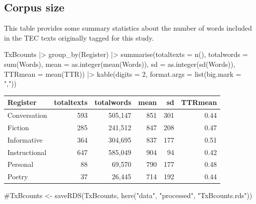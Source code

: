 \documentclass[
  letterpaper,
  DIV=11,
  numbers=noendperiod]{scrreprt}
\newenvironment{Shaded}{\begin{snugshade}}{\end{snugshade}}
\newcommand{\AttributeTok}[1]{\textcolor[rgb]{0.40,0.45,0.13}{#1}}
\newcommand{\CommentTok}[1]{\textcolor[rgb]{0.37,0.37,0.37}{#1}}
\newcommand{\DecValTok}[1]{\textcolor[rgb]{0.68,0.00,0.00}{#1}}
\newcommand{\FunctionTok}[1]{\textcolor[rgb]{0.28,0.35,0.67}{#1}}
\newcommand{\NormalTok}[1]{\textcolor[rgb]{0.00,0.23,0.31}{#1}}
\newcommand{\SpecialCharTok}[1]{\textcolor[rgb]{0.37,0.37,0.37}{#1}}
\newcommand{\StringTok}[1]{\textcolor[rgb]{0.13,0.47,0.30}{#1}}
\begin{document}
\subsection{Corpus size}\label{corpus-size}

This table provides some summary statistics about the number of words
included in the TEC texts originally tagged for this study.

\begin{Shaded}
\begin{Highlighting}[]
\NormalTok{TxBcounts  }\SpecialCharTok{|\textgreater{}}  
  \FunctionTok{group\_by}\NormalTok{(Register) }\SpecialCharTok{|\textgreater{}}  
  \FunctionTok{summarise}\NormalTok{(}\AttributeTok{totaltexts =} \FunctionTok{n}\NormalTok{(), }\AttributeTok{totalwords =} \FunctionTok{sum}\NormalTok{(Words), }\AttributeTok{mean =} \FunctionTok{as.integer}\NormalTok{(}\FunctionTok{mean}\NormalTok{(Words)), }\AttributeTok{sd =} \FunctionTok{as.integer}\NormalTok{(}\FunctionTok{sd}\NormalTok{(Words)), }\AttributeTok{TTRmean =} \FunctionTok{mean}\NormalTok{(TTR)) }\SpecialCharTok{|\textgreater{}}  
  \FunctionTok{kable}\NormalTok{(}\AttributeTok{digits =} \DecValTok{2}\NormalTok{, }\AttributeTok{format.args =} \FunctionTok{list}\NormalTok{(}\AttributeTok{big.mark =} \StringTok{","}\NormalTok{))}
\end{Highlighting}
\end{Shaded}

\begin{longtable}[]{@{}lrrrrr@{}}
\toprule\noalign{}
Register & totaltexts & totalwords & mean & sd & TTRmean \\
\midrule\noalign{}
\endhead
\bottomrule\noalign{}
\endlastfoot
Conversation & 593 & 505,147 & 851 & 301 & 0.44 \\
Fiction & 285 & 241,512 & 847 & 208 & 0.47 \\
Informative & 364 & 304,695 & 837 & 177 & 0.51 \\
Instructional & 647 & 585,049 & 904 & 94 & 0.42 \\
Personal & 88 & 69,570 & 790 & 177 & 0.48 \\
Poetry & 37 & 26,445 & 714 & 192 & 0.44 \\
\end{longtable}

\begin{Shaded}
\begin{Highlighting}[]
\CommentTok{\#TxBcounts \textless{}{-} saveRDS(TxBcounts, here("data", "processed", "TxBcounts.rds"))}
\end{Highlighting}
\end{Shaded}
\end{document}

